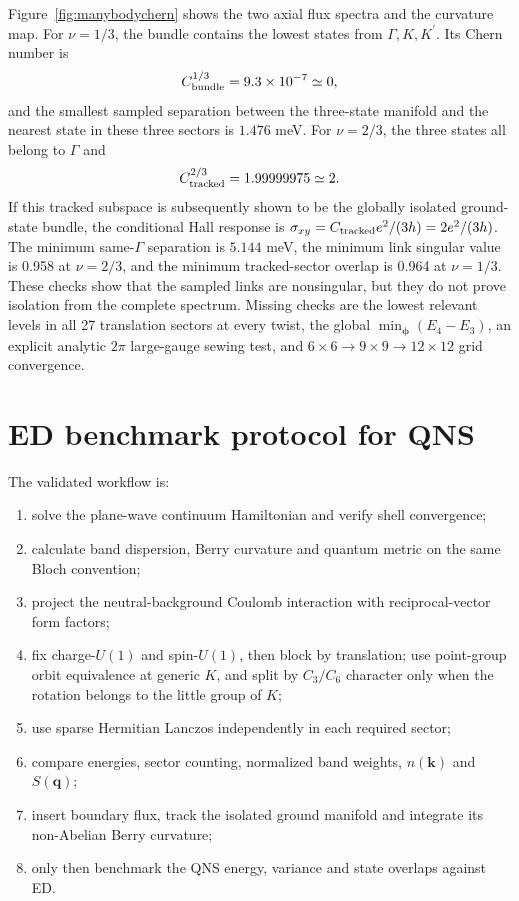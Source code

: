 \documentclass[10pt,twocolumn]{article}
\begin{document}
Figure~\ref{fig:manybodychern} shows the two axial flux spectra and the curvature map.  For $\nu=1/3$, the bundle contains the lowest states from $\Gamma,K,K^{\prime}$.  Its Chern number is
\begin{equation}
C_{\rm bundle}^{1/3}=9.3\times10^{-7}\simeq0,
\end{equation}
and the smallest sampled separation between the three-state manifold and the nearest state in these three sectors is $1.476$ meV.  For $\nu=2/3$, the three states all belong to $\Gamma$ and
\begin{equation}
C_{\rm tracked}^{2/3}=1.99999975\simeq2.
\end{equation}
If this tracked subspace is subsequently shown to be the globally isolated
ground-state bundle, the conditional Hall response is
$\sigma_{xy}=C_{\rm tracked}e^2/(3h)=2e^2/(3h)$.
The minimum same-$\Gamma$ separation is $5.144$ meV, the minimum link singular
value is 0.958 at $\nu=2/3$, and the minimum tracked-sector overlap is 0.964
at $\nu=1/3$.  These checks show that the sampled links are nonsingular, but
they do not prove isolation from the complete spectrum.  Missing checks are
the lowest relevant levels in all 27 translation sectors at every twist, the
global $\min_{\bm\phi}(E_4-E_3)$, an explicit analytic $2\pi$ large-gauge
sewing test, and $6\times6\to9\times9\to12\times12$ grid convergence.

\section{ED benchmark protocol for QNS}

The validated workflow is:
\begin{enumerate}
\item solve the plane-wave continuum Hamiltonian and verify shell convergence;
\item calculate band dispersion, Berry curvature and quantum metric on the same Bloch convention;
\item project the neutral-background Coulomb interaction with reciprocal-vector form factors;
\item fix charge-$U(1)$ and spin-$U(1)$, then block by translation; use point-group orbit equivalence at generic $K$, and split by $C_3/C_6$ character only when the rotation belongs to the little group of $K$;
\item use sparse Hermitian Lanczos independently in each required sector;
\item compare energies, sector counting, normalized band weights, $n(\bm k)$ and $S(\bm q)$;
\item insert boundary flux, track the isolated ground manifold and integrate its non-Abelian Berry curvature;
\item only then benchmark the QNS energy, variance and state overlaps against ED.
\end{enumerate}
\end{document}
